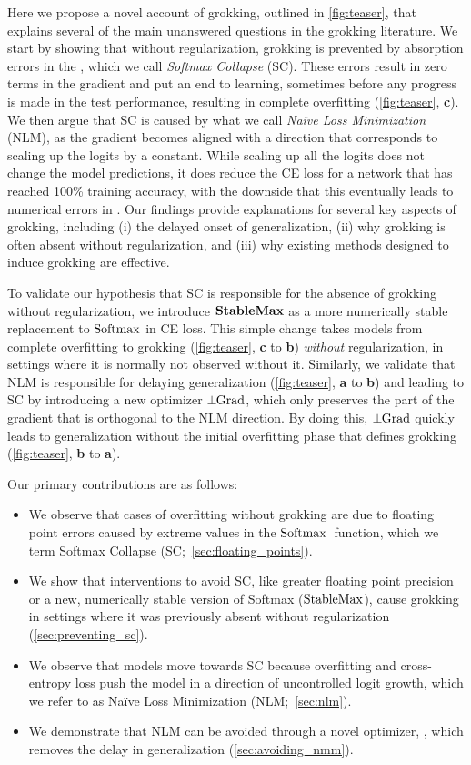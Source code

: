 Here we propose a novel account of grokking, outlined in \cref{fig:teaser}, that explains several of the main unanswered questions in the grokking literature. We start by showing that without regularization, grokking is prevented by absorption errors in the \softmax, which we call \emph{Softmax Collapse} (SC). These errors result in zero terms in the gradient and put an end to learning, sometimes before any progress is made in the test performance, resulting in complete overfitting (\cref{fig:teaser}, \textbf{c}). We then argue that SC is caused by what we call \emph{Naïve Loss Minimization} (NLM), as the gradient becomes aligned with a direction that corresponds to scaling up the logits by a constant. While scaling up all the logits does not change the model predictions, it does reduce the CE loss for a network that has reached 100\% training accuracy, with the downside that this eventually leads to numerical errors in \softmax. 
Our findings provide explanations for several key aspects of grokking, including (i) the delayed onset of generalization, (ii) why grokking is often absent without regularization, and (iii) why existing methods designed to induce grokking are effective.

To validate our hypothesis that SC is responsible for the absence of grokking without regularization, we introduce $\bm{\mathrm{StableMax}}$ as a more numerically stable replacement to $\mathrm{Softmax}$ in CE loss. This simple change takes models from complete overfitting to grokking (\cref{fig:teaser}, \textbf{c} to \textbf{b}) \textit{without} regularization, in settings where it is normally not observed without it. Similarly, we validate that NLM is responsible for delaying generalization (\cref{fig:teaser}, \textbf{a} to \textbf{b}) and leading to SC by introducing a new optimizer $\perp\!\mathrm{\!Grad}$, which only preserves the part of the gradient that is orthogonal to the NLM direction. By doing this, $\perp\!\mathrm{\!Grad}$ quickly leads to generalization without the initial overfitting phase that defines grokking (\cref{fig:teaser}, \textbf{b} to \textbf{a}).

Our primary contributions are as follows:
\begin{itemize}[leftmargin=*,topsep=0em,noitemsep]
    \item We observe that cases of overfitting without grokking are due to floating point errors caused by extreme values in the $\mathrm{Softmax}$~function, which we term Softmax Collapse (SC;~\cref{sec:floating_points}).
    \item We show that interventions to avoid SC, like greater floating point precision or a new, numerically stable version of Softmax ($\mathrm{StableMax}$), cause grokking in settings where it was previously absent without regularization (\cref{sec:preventing_sc}).
    \item We observe that models move towards SC because overfitting and cross-entropy loss push the model in a direction of uncontrolled logit growth, which we refer to as Naïve Loss Minimization (NLM;~\cref{sec:nlm}).
    \item We demonstrate that NLM can be avoided through a novel optimizer, \ograd, which removes the delay in generalization (\cref{sec:avoiding_nmm}).
\end{itemize}


